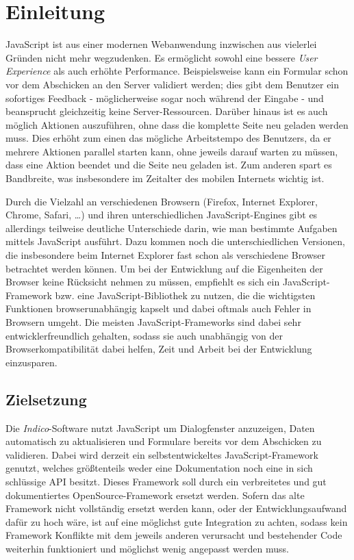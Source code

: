 \chapter{Einleitung}

JavaScript ist aus einer modernen Webanwendung inzwischen aus vielerlei Gründen nicht mehr
wegzudenken. Es ermöglicht sowohl eine bessere \emph{User Experience} als auch erhöhte Performance.
Beispielsweise kann ein Formular schon vor dem Abschicken an den Server validiert werden; dies gibt
dem Benutzer ein sofortiges Feedback - möglicherweise sogar noch während der Eingabe - und
beansprucht gleichzeitig keine Server-Ressourcen. Darüber hinaus ist es auch möglich Aktionen
auszuführen, ohne dass die komplette Seite neu geladen werden muss. Dies erhöht zum einen das
mögliche Arbeitstempo des Benutzers, da er mehrere Aktionen parallel starten kann, ohne jeweils darauf
warten zu müssen, dass eine Aktion beendet und die Seite neu geladen ist. Zum anderen spart es
Bandbreite, was insbesondere im Zeitalter des mobilen Internets wichtig ist.

Durch die Vielzahl an verschiedenen Browsern (Firefox, Internet Explorer, Chrome, Safari, \ldots) und ihren
unterschiedlichen JavaScript-Engines gibt es allerdings teilweise deutliche Unterschiede darin, wie
man bestimmte Aufgaben mittels JavaScript ausführt. Dazu kommen noch die unterschiedlichen Versionen,
die insbesondere beim Internet Explorer fast schon als verschiedene Browser betrachtet werden
können. Um bei der Entwicklung auf die Eigenheiten der Browser keine Rücksicht nehmen zu müssen,
empfiehlt es sich ein JavaScript-Framework bzw. eine JavaScript-Bibliothek zu nutzen, die die
wichtigsten Funktionen browserunabhängig kapselt und dabei oftmals auch Fehler in Browsern umgeht.
Die meisten JavaScript-Frameworks sind dabei sehr entwicklerfreundlich gehalten, sodass sie auch
unabhängig von der Browserkompatibilität dabei helfen, Zeit und Arbeit bei der Entwicklung
einzusparen.


\section{Zielsetzung}

Die \emph{Indico}-Software nutzt JavaScript um Dialogfenster anzuzeigen, Daten automatisch zu
aktualisieren und Formulare bereits vor dem Abschicken zu validieren. Dabei wird derzeit ein
selbstentwickeltes JavaScript-Framework genutzt, welches größtenteils weder eine Dokumentation
noch eine in sich schlüssige API besitzt. Dieses Framework soll durch ein verbreitetes und gut
dokumentiertes OpenSource-Framework ersetzt werden. Sofern das alte Framework nicht vollständig
ersetzt werden kann, oder der Entwicklungsaufwand dafür zu hoch wäre, ist auf eine möglichst gute
Integration zu achten, sodass kein Framework Konflikte mit dem jeweils anderen verursacht und
bestehender Code weiterhin funktioniert und möglichst wenig angepasst werden muss.

